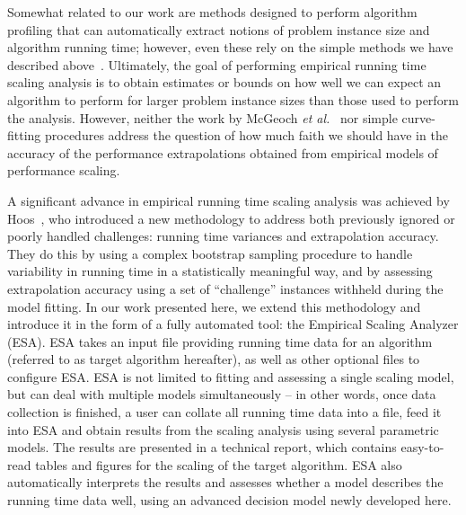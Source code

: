 \documentclass[aic]{iosart2x}
\newcommand{\etal}{\emph{et al.}}
\begin{document}
Somewhat related to our work are methods designed to perform algorithm profiling that can automatically extract notions of problem instance size and algorithm running time; however, even these rely on the simple methods we have described above~\cite{ZapHau12,CopEtAl12,CopEtAl14}. 
Ultimately, the goal of performing empirical running time scaling analysis is to obtain estimates or bounds on how well we can expect an algorithm to perform for larger problem instance sizes than those used to perform the analysis.
However, neither the work by McGeoch \etal~\cite{McgEtAl02} nor simple curve-fitting procedures address the question of how much faith we should have in the accuracy of the performance extrapolations obtained from empirical models of performance scaling.

A significant advance in empirical running time scaling analysis was achieved by Hoos~\cite{Hoo09}, who introduced a new methodology to address both previously ignored or poorly handled challenges: running time variances and extrapolation accuracy.
They do this by using a complex bootstrap sampling procedure to handle variability in running time in a statistically meaningful way, and by assessing extrapolation accuracy using a set of ``challenge'' instances withheld during the model fitting.  
In our work presented here, we extend this methodology and introduce it in the form of a fully automated tool: the Empirical Scaling Analyzer (ESA). 
ESA takes an input file providing running time data for an algorithm (referred to as target algorithm hereafter), as well as other optional files to configure ESA. 
ESA is not limited to fitting and assessing a single scaling model, but can deal with multiple models simultaneously -- in other words, once data collection is finished, a user can collate all running time data into a file, feed it into ESA and obtain results from the scaling analysis using several parametric models. 
The results are presented in a technical report, which contains easy-to-read tables and figures for the scaling of the target algorithm. 
ESA also automatically interprets the results and assesses whether a model describes the running time data well, using an advanced decision model newly developed here.
\end{document}
